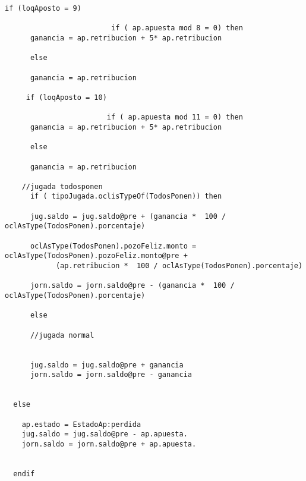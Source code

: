 \begin{framed}
\begin{lstlisting}[breaklines=true]
                 if (loqAposto = 9)

                         if ( ap.apuesta mod 8 = 0) then
      ganancia = ap.retribucion + 5* ap.retribucion
      
      else
      
      ganancia = ap.retribucion 
      
     if (loqAposto = 10)

                        if ( ap.apuesta mod 11 = 0) then
      ganancia = ap.retribucion + 5* ap.retribucion
      
      else
      
      ganancia = ap.retribucion 
      
    //jugada todosponen
      if ( tipoJugada.oclisTypeOf(TodosPonen)) then 
    
      jug.saldo = jug.saldo@pre + (ganancia *  100 / oclAsType(TodosPonen).porcentaje)
    
      oclAsType(TodosPonen).pozoFeliz.monto = oclAsType(TodosPonen).pozoFeliz.monto@pre + 
            (ap.retribucion *  100 / oclAsType(TodosPonen).porcentaje)

      jorn.saldo = jorn.saldo@pre - (ganancia *  100 / oclAsType(TodosPonen).porcentaje)

      else

      //jugada normal


      jug.saldo = jug.saldo@pre + ganancia
      jorn.saldo = jorn.saldo@pre - ganancia  
  

  else

    ap.estado = EstadoAp:perdida
    jug.saldo = jug.saldo@pre - ap.apuesta.
    jorn.saldo = jorn.saldo@pre + ap.apuesta.


  endif
\end{lstlisting}  

\end{framed}